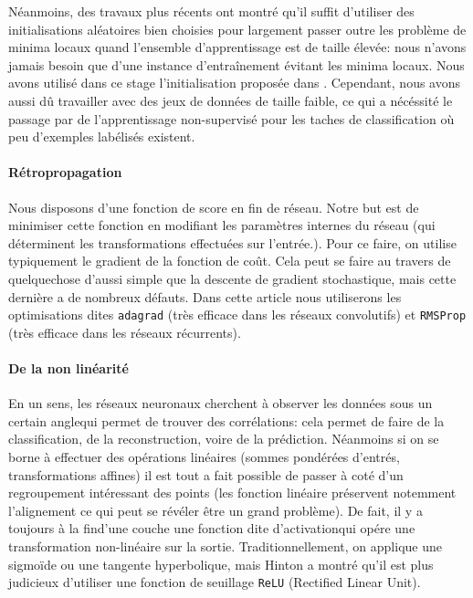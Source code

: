 \documentclass[a4paper, journal, 11pt, onecolumn]{IEEEtran}
\begin{document}
Néanmoins, des travaux plus récents ont montré qu'il suffit d'utiliser des
initialisations aléatoires bien choisies pour largement passer outre les problème
de minima locaux quand l'ensemble d'apprentissage est de taille élevée: nous n'avons jamais besoin que d'une instance d'entraînement
évitant les minima locaux. Nous avons utilisé dans ce stage l'initialisation
proposée dans . Cependant, nous avons aussi dû travailler avec des jeux de
données de taille faible, ce qui a nécéssité le passage par de l'apprentissage
non-supervisé pour les taches de classification où peu d'exemples labélisés existent.

\paragraph{Rétropropagation}

Nous disposons d'une fonction de score en fin de réseau. Notre but est de
minimiser cette fonction en modifiant les paramètres internes du réseau (qui
déterminent les transformations effectuées sur l'entrée.). Pour ce faire, on
utilise typiquement le gradient de la fonction de coût. Cela peut se faire au
travers de quelquechose d'aussi simple que la descente de gradient stochastique, mais cette
dernière a de nombreux défauts. Dans cette article nous utiliserons les
optimisations dites \texttt{adagrad} (très efficace dans les réseaux
convolutifs) et \texttt{RMSProp} (très efficace dans les réseaux récurrents).

\paragraph{De la non linéarité}

En un sens, les réseaux neuronaux cherchent à observer les données \og sous un
certain angle\fg qui permet de trouver des corrélations: cela permet de faire de
la classification, de la reconstruction, voire de la prédiction. Néanmoins si on
se borne à effectuer des opérations linéaires (sommes pondérées
d'entrés, transformations affines) il est tout a fait possible de passer à coté
d'un regroupement intéressant des points (les fonction linéaire préservent
notemment l'alignement ce qui peut se révéler être un grand problème). De fait,
il y a toujours \og à la fin\fg d'une couche une fonction dite \og
d'activation\fg qui opére une transformation non-linéaire sur la sortie.
Traditionnellement, on applique une sigmoïde ou une tangente hyperbolique, mais
Hinton a montré qu'il est plus judicieux d'utiliser une fonction de seuillage
\texttt{ReLU} (Rectified Linear Unit).
\end{document}
